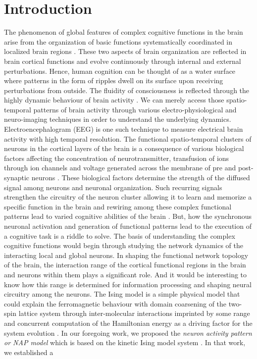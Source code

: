 \documentclass[preprintnumbers,amsmath,amssymb,onecolumn]{revtex4}
\begin{document}

\maketitle
\vskip 1cm
\section{Introduction}

{\noindent}The phenomenon of global features of complex cognitive functions in the brain arise from the organization of basic functions systematically coordinated in localized brain regions \citep{luria1980}. These two aspects of brain organization are reflected in brain cortical functions and evolve continuously through internal and external perturbations. Hence, human cognition can be thought of as a water surface where patterns in the form of ripples dwell on its surface upon receiving perturbations from outside. The fluidity of consciousness is reflected through the highly dynamic behaviour of brain activity \citep{Chialvo2010}. We can merely access those spatio-temporal patterns of brain activity through various electro-physiological and neuro-imaging techniques in order to understand the underlying dynamics. Electroencephalogram (EEG) is one such technique to measure electrical brain activity with high temporal resolution. The functional spatio-temporal clusters of neurons in the cortical layers of the brain is a consequence of various biological factors affecting the concentration of neurotransmitter, transfusion of ions through ion channels and voltage generated across the membrane of pre and post-synaptic neurons \citep{Klinshov2014, Voglis2006}. These biological factors determine the strength of the diffused signal among neurons and neuronal organization. Such recurring signals strengthen the circuitry of the neuron cluster allowing it to learn and memorize a specific function in the brain and rewiring among these complex functional patterns lead to varied cognitive abilities of the brain \citep{Colicos2006,Eguiluz2005a,Sporns2000,Sporns2002,Sporns2002a}. But, how the synchronous neuronal activation and generation of functional patterns lead to the execution of a cognitive task is a riddle to solve. The basis of understanding the complex cognitive functions would begin through studying the network dynamics of the interacting local and global neurons. In shaping the functional network topology of the brain, the interaction range of the cortical functional regions in the brain and neurons within them plays a significant role. And it would be interesting to know how this range is determined for information processing and shaping neural circuitry among the neurons. The Ising model is a simple physical model that could explain the ferromagnetic behaviour with domain coarsening of the two-spin lattice system through inter-molecular interactions imprinted by some range and concurrent computation of the Hamiltonian energy as a driving factor for the system evolution \cite{McCoy2014}. In our foregoing work, we proposed the \textit{neuron activity pattern or NAP model} which is based on the kinetic Ising model system \cite{Gundh2015}. In that work, we established a 
\end{document}
